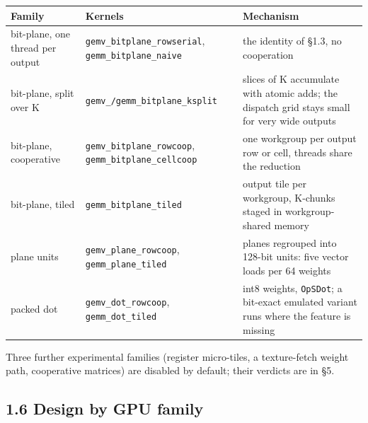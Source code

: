 \documentclass[
  10pt,
]{article}
\newcounter{none} %
\begin{document}
{\def\LTcaptype{none} %
\begin{longtable}[]{@{}
  >{\raggedright\arraybackslash}p{}
  >{\raggedright\arraybackslash}p{}
  >{\raggedright\arraybackslash}p{}@{}}
\toprule\noalign{}
\begin{minipage}[b]{\linewidth}\raggedright%
Family
\end{minipage} & \begin{minipage}[b]{\linewidth}\raggedright%
Kernels
\end{minipage} & \begin{minipage}[b]{\linewidth}\raggedright%
Mechanism
\end{minipage} \\
\midrule\noalign{}
\endhead%
\bottomrule\noalign{}
\endlastfoot%
bit-plane, one thread per output & \texttt{gemv\_bitplane\_rowserial},
\texttt{gemm\_bitplane\_naive} & the identity of \S{}1.3, no cooperation \\
bit-plane, split over K & \texttt{gemv\_/gemm\_bitplane\_ksplit} &
slices of K accumulate with atomic adds; the dispatch grid stays small
for very wide outputs \\
bit-plane, cooperative & \texttt{gemv\_bitplane\_rowcoop},
\texttt{gemm\_bitplane\_cellcoop} & one workgroup per output row or
cell, threads share the reduction \\
bit-plane, tiled & \texttt{gemm\_bitplane\_tiled} & output tile per
workgroup, K-chunks staged in workgroup-shared memory \\
plane units & \texttt{gemv\_plane\_rowcoop}, \texttt{gemm\_plane\_tiled}
& planes regrouped into 128-bit units: five vector loads per 64
weights \\
packed dot & \texttt{gemv\_dot\_rowcoop}, \texttt{gemm\_dot\_tiled} &
int8 weights, \texttt{OpSDot}; a bit-exact emulated variant runs where
the feature is missing \\
\end{longtable}
}

Three further experimental families (register micro-tiles, a
texture-fetch weight path, cooperative matrices) are disabled by
default; their verdicts are in \S{}5.

\subsection{1.6 Design by GPU family}\label{design-by-gpu-family}
\end{document}
